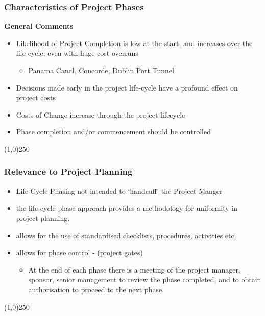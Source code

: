 \begin{frame}
\frametitle{Characteristics of Project Phases}
\textbf{General Comments}\\
\begin{itemize}
	\item Likelihood of Project Completion is low at the start, and increases over the life cycle; even with huge cost overruns	
		\begin{itemize}
			\item Panama Canal, Concorde, Dublin Port Tunnel
		\end{itemize}
	\item Decisions made early in the project life-cycle have a profound effect on project costs
	\item Costs of Change increase through the project lifecycle
	\item Phase completion and/or commencement should be controlled
\end{itemize}
\end{frame}
\begin{center}\line(1,0){250}\end{center}



\begin{frame}
\frametitle{Relevance to Project Planning}
\begin{itemize}
	\item Life Cycle Phasing not intended to `handcuff' the Project Manger\\
	\item the life-cycle phase approach provides a methodology for uniformity in project planning.\\
	\item allows for the use of standardised checklists, procedures, activities etc.\\
	\item allows for phase control - (project gates)\\
		\begin{itemize}
			\item At the end of each phase there is a meeting of the project manager, sponsor, senior management to review the phase completed, and to obtain authorisation to proceed to the next phase.
		\end{itemize}
\end{itemize}
\end{frame}
\begin{center}\line(1,0){250}\end{center}



